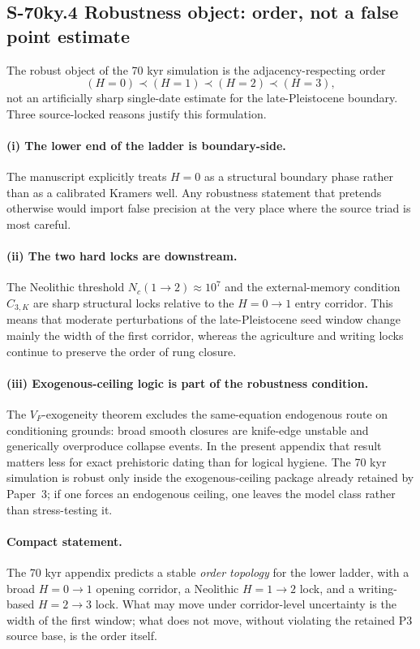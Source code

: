 \documentclass[11pt]{article}
\begin{document}
\subsection*{S-70ky.4 Robustness object: order, not a false point estimate}
\label{sec:S-70ky.4}The robust object of the 70 kyr simulation is the adjacency-respecting order\[(H{=}0)\prec(H{=}1)\prec(H{=}2)\prec(H{=}3),\]not an artificially sharp single-date estimate for the late-Pleistocene boundary. Three source-locked reasons justify this formulation.
\paragraph{(i) The lower end of the ladder is boundary-side.}The manuscript explicitly treats $H{=}0$ as a structural boundary phase rather than as a calibrated Kramers well. Any robustness statement that pretends otherwise would import false precision at the very place where the source triad is most careful.
\paragraph{(ii) The two hard locks are downstream.}The Neolithic threshold $N_c(1\to 2)\approx 10^7$ and the external-memory condition $C_{3,K}$ are sharp structural locks relative to the $H{=}0\to 1$ entry corridor. This means that moderate perturbations of the late-Pleistocene seed window change mainly the width of the first corridor, whereas the agriculture and writing locks continue to preserve the order of rung closure.
\paragraph{(iii) Exogenous-ceiling logic is part of the robustness condition.}The $V_F$-exogeneity theorem excludes the same-equation endogenous route on conditioning grounds: broad smooth closures are knife-edge unstable and generically overproduce collapse events. In the present appendix that result matters less for exact prehistoric dating than for logical hygiene. The 70 kyr simulation is robust only inside the exogenous-ceiling package already retained by Paper~3; if one forces an endogenous ceiling, one leaves the model class rather than stress-testing it.
\paragraph{Compact statement.}The 70 kyr appendix predicts a stable \emph{order topology} for the lower ladder, with a broad $H{=}0\to 1$ opening corridor, a Neolithic $H{=}1\to 2$ lock, and a writing-based $H{=}2\to 3$ lock. What may move under corridor-level uncertainty is the width of the first window; what does not move, without violating the retained P3 source base, is the order itself.
\end{document}
